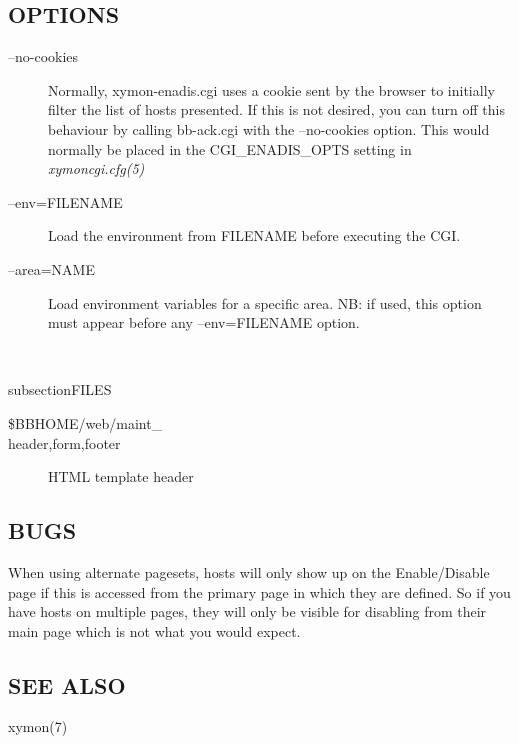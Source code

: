 \subsection{OPTIONS}
\begin{description}
\item[--no-cookies] Normally, xymon-enadis.cgi uses a cookie sent by
  the browser to initially filter the list of hosts presented. If this
  is not desired, you can turn off this behaviour by calling
  bb-ack.cgi with the --no-cookies option. This would normally be
  placed in the CGI\_ENADIS\_OPTS setting in \emph{xymoncgi.cfg(5)}



 

\item[--env=FILENAME] Load the environment from FILENAME before
  executing the CGI. 


 

\item[--area=NAME] Load environment variables for a specific area. NB:
  if used, this option must appear before any --env=FILENAME option. 

\end{description}
\

subsection{FILES}
\begin{description}
\item [\$BBHOME/web/maint\_\\{header,form,footer\\}] HTML template header 

 


\end{description}
\subsection{BUGS}
 When using alternate pagesets, hosts will only show up on the
 Enable/Disable page if this is accessed from the primary page in
 which they are defined. So if you have hosts on multiple pages, they
 will only be visible for disabling from their main page which is not
 what you would expect. 


 
\subsection{SEE ALSO}
xymon(7) 

 
%
\newpage
